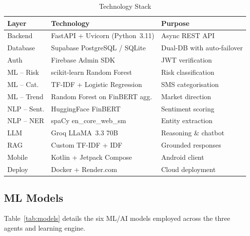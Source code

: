 \documentclass[conference]{IEEEtran}
\begin{document}
\begin{table}[!t]
\centering
\caption{Technology Stack}
\label{tab:techstack}
\renewcommand{\arraystretch}{1.15}
\footnotesize
\begin{tabular}{p{1.4cm} p{2.8cm} p{3cm}}
\toprule
\textbf{Layer} & \textbf{Technology} & \textbf{Purpose} \\
\midrule
Backend       & FastAPI + Uvicorn (Python~3.11)     & Async REST API \\
Database      & Supabase PostgreSQL / SQLite        & Dual-DB with auto-failover \\
Auth          & Firebase Admin SDK                  & JWT verification \\
ML -- Risk    & scikit-learn Random Forest          & Risk classification \\
ML -- Cat.    & TF-IDF + Logistic Regression        & SMS categorisation \\
ML -- Trend   & Random Forest on FinBERT agg.       & Market direction \\
NLP -- Sent.  & HuggingFace FinBERT                 & Sentiment scoring \\
NLP -- NER    & spaCy en\_core\_web\_sm              & Entity extraction \\
LLM           & Groq LLaMA~3.3 70B                  & Reasoning \& chatbot \\
RAG           & Custom TF-IDF + IDF                 & Grounded responses \\
Mobile        & Kotlin + Jetpack Compose            & Android client \\
Deploy        & Docker + Render.com                 & Cloud deployment \\
\bottomrule
\end{tabular}
\end{table}

\subsection{ML Models}

Table~\ref{tab:models} details the six ML/AI models employed across the three agents and learning engine.
\end{document}
